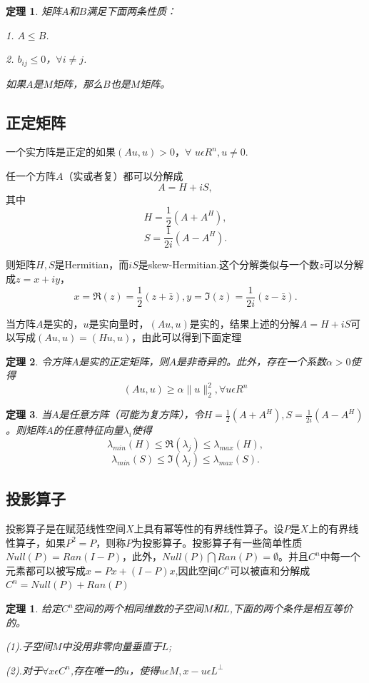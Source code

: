 \documentclass{article}
\begin{document}
\newtheorem{thm}{定理}
\begin{thm}
矩阵$A$和$B$满足下面两条性质：

1. $A\le B$.

2. $b_{ij}\le 0$，$\forall i\neq j$.

如果$A$是$M$矩阵，那么$B$也是$M$矩阵。
\end{thm}

\subsection{正定矩阵}
一个实方阵是正定的如果$(Au,u)>0$，$\forall$ $ u  \epsilon  R^n,u\neq 0.$

任一个方阵$A$（实或者复）都可以分解成
$$A=H+iS,$$
其中
$$H=\frac{1}{2}(A+A^H),$$
$$S=\frac{1}{2i}(A-A^H).$$

则矩阵$H,S$是Hermitian，而$iS$是skew-Hermitian.这个分解类似与一个数$z$可以分解成$z=x+iy$，
$$x=\Re (z)=\frac{1}{2}(z+\bar{z}),y=\Im (z)=\frac{1}{2i}(z-\bar{z}).$$

当方阵$A$是实的，$u$是实向量时，$(Au,u)$是实的，结果上述的分解$A=H+iS$可以写成$(Au,u)=(Hu,u)$，由此可以得到下面定理

\begin{thm}
令方阵$A$是实的正定矩阵，则$A$是非奇异的。此外，存在一个系数$\alpha >0$使得
$$(Au,u)\geqslant \alpha \parallel u \parallel _2^2,\forall u\epsilon R^n$$
\end{thm}

\begin{thm}
当$A$是任意方阵（可能为复方阵），令$H=\frac{1}{2}(A+A^H),S=\frac{1}{2i}(A-A^H)$。则矩阵$A$的任意特征向量$\lambda _i$使得
$$\lambda_{min}(H)\leqslant \Re (\lambda _j)\leqslant \lambda_{max}(H),$$
$$\lambda_{min}(S)\leqslant \Im (\lambda _j)\leqslant \lambda_{max}(S).$$
\end{thm}

\subsection{投影算子}
投影算子是在赋范线性空间$X$上具有幂等性的有界线性算子。设$P$是$X$上的有界线性算子，如果$P^2=P$，则称$P$为投影算子。投影算子有一些简单性质$Null(P)=Ran(I-P)$，此外，$Null(P)\bigcap Ran(P)=\emptyset$。并且$C^n$中每一个元素都可以被写成$x=Px+(I-P)x$,因此空间$C^n$可以被直和分解成$C^n=Null(P)+Ran(P)$
\newtheorem{thm}{定理}
\begin{thm}
给定$C^n$空间的两个相同维数的子空间$M$和$L$,下面的两个条件是相互等价的。

(1).子空间$M$中没用非零向量垂直于$L$;

(2).对于$\forall x\epsilon C^n$,存在唯一的$u$，使得$u\epsilon M,x-u\epsilon L^\bot$
\end{thm}
\end{document}
